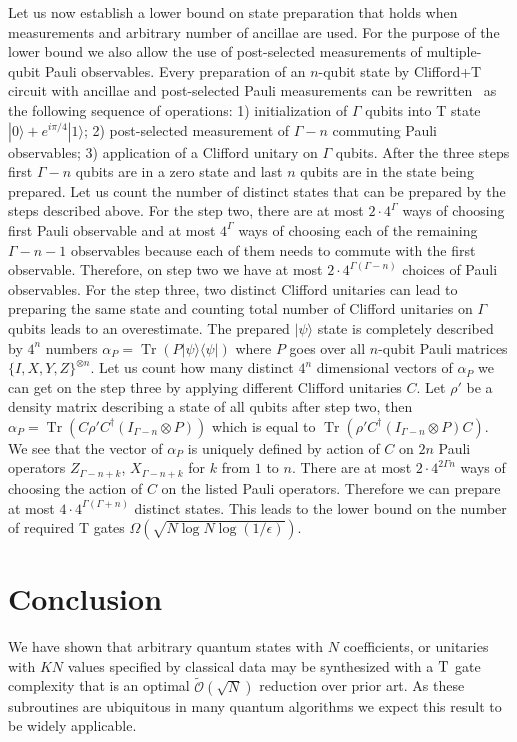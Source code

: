 \documentclass[a4paper,onecolumn,10pt,accepted=2024-05-22]{quantumarticle}
\newcommand{\ket}[1]{| #1\rangle}        %
\newcommand{\bra}[1]{\langle #1|}        %
\begin{document}
	Let us now establish a lower bound on state preparation that holds when measurements and arbitrary number of ancillae are used.
	For the purpose of the lower bound we also allow the use of post-selected measurements of multiple-qubit Pauli observables.
	Every preparation of an $n$-qubit state by Clifford+T circuit with ancillae and post-selected Pauli measurements can be rewritten~\cite{BCHK2018} as the following sequence of operations: 
	1) initialization of $\Gamma$ qubits into T state $\ket{0}+e^{i\pi/4}\ket{1}$; 
	2) post-selected measurement of $\Gamma - n$ commuting Pauli observables;
	3) application of a Clifford unitary on $\Gamma$ qubits.
	After the three steps first $\Gamma - n$ qubits are in a zero state and last $n$ qubits are in the state being prepared.
	Let us count the number of distinct states that can be prepared by the steps described above. 
	For the step two, there are at most $2\cdot4^{\Gamma}$ ways of choosing first Pauli observable and
	at most $4^{\Gamma}$ ways of choosing each of the remaining $\Gamma-n-1$ observables because
	each of them needs to commute with the first observable.
	Therefore, on step two we have at most $2\cdot4^{\Gamma(\Gamma-n)}$ choices of Pauli observables.
	For the step three, two distinct Clifford unitaries can lead to preparing the same state and
	counting total number of Clifford unitaries on $\Gamma$ qubits leads to an overestimate.
	The prepared $\ket{\psi}$ state is completely described by $4^n$ numbers $\alpha_P = \operatorname{Tr}(P\ket{\psi}\bra{\psi})$ where $P$ goes over all $n$-qubit Pauli matrices $\{I,X,Y,Z\}^{\otimes n}$.
	Let us count how many distinct $4^n$ dimensional vectors of $\alpha_P$ we can get on the step three by applying different Clifford unitaries $C$.
	Let $\rho'$ be a density matrix describing a state of all qubits after step two, then 
	$\alpha_P = \operatorname{Tr}(C\rho'C^\dagger (I_{\Gamma-n} \otimes P))$  
	which is equal to $\operatorname{Tr}(\rho' C^\dagger (I_{\Gamma-n} \otimes P) C)$. 
	We see that the vector of $\alpha_P$ is uniquely defined by action of $C$ on $2 n$ Pauli operators $Z_{\Gamma-n+k}$, $X_{\Gamma-n+k}$ for $k$ from $1$ to $n$.
	There are at most $2\cdot 4^{2\Gamma n}$ ways of choosing the action of $C$ on the listed Pauli operators. Therefore we can prepare at most $4\cdot4^{\Gamma(\Gamma+n)}$ distinct states. 
	This leads to the lower bound on the number of required \textsc{T} gates
	$\Omega\left(\sqrt{N \log N \log(1/\epsilon)}\right)$.
	
	\section{Conclusion}
	We have shown that arbitrary quantum states with $N$ coefficients, or unitaries with $KN$ values specified by classical data may be synthesized with a $\textsc{T}$ gate complexity that is an optimal $\tilde{\mathcal{O}}(\sqrt{N})$ reduction over prior art. As these subroutines are ubiquitous in many quantum algorithms we expect this result to be widely applicable. 
 
\end{document}
